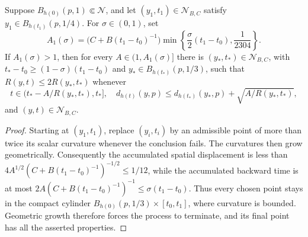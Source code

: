 \begin{lemma}
\label{lem:chow-iii-spacetime-point-picking}

Suppose \(B_{h(0)}(p,1)\Subset\mathcal N\), and let
\((y_1,t_1)\in\mathcal N_{B,C}\) satisfy
\(y_1\in B_{h(t_1)}(p,1/4)\).  For \(\sigma\in(0,1)\), set
\[
 A_1(\sigma)=\bigl(C+B(t_1-t_0)^{-1}\bigr)
 \min\left\{\frac\sigma2(t_1-t_0),\frac1{2304}\right\}.
\]
If \(A_1(\sigma)>1\), then for every \(A\in(1,A_1(\sigma)]\) there is
\((y_*,t_*)\in\mathcal N_{B,C}\), with
\(t_*-t_0\ge(1-\sigma)(t_1-t_0)\) and
\(y_*\in B_{h(t_*)}(p,1/3)\), such that \(R(y,t)\le2R(y_*,t_*)\) whenever
\[
 t\in(t_*-A/R(y_*,t_*),t_*],
 \quad d_{h(t)}(y,p)\le d_{h(t_*)}(y_*,p)+\sqrt{A/R(y_*,t_*)},
\]
and \((y,t)\in\mathcal N_{B,C}\).
\end{lemma}
\begin{proof}
\sketch Starting at \((y_1,t_1)\), replace \((y_i,t_i)\) by an admissible point of
more than twice its scalar curvature whenever the conclusion fails.  The
curvatures then grow geometrically.  Consequently the accumulated spatial
displacement is less than
\(4A^{1/2}(C+B(t_1-t_0)^{-1})^{-1/2}\le1/12\), while the accumulated backward
time is at most \(2A(C+B(t_1-t_0)^{-1})^{-1}\le\sigma(t_1-t_0)\).  Thus every
chosen point stays in the compact cylinder
\(B_{h(0)}(p,1/3)\times[t_0,t_1]\), where curvature is bounded.  Geometric
growth therefore forces the process to terminate, and its final point has all
the asserted properties.
\end{proof}

